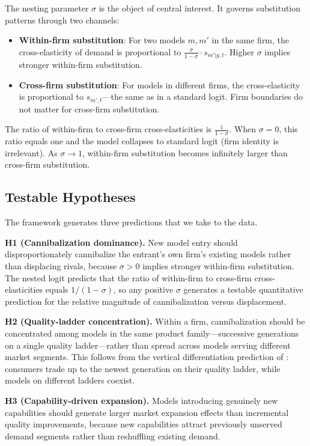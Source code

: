 \documentclass[11pt, a4paper]{article}
\begin{document}
The nesting parameter $\sigma$ is the object of central interest. It governs substitution patterns through two channels:

\begin{itemize}[nosep]
\item \textbf{Within-firm substitution}: For two models $m, m'$ in the same firm, the cross-elasticity of demand is proportional to $\frac{\sigma}{1-\sigma} \cdot s_{m'|g,t}$. Higher $\sigma$ implies stronger within-firm substitution.
\item \textbf{Cross-firm substitution}: For models in different firms, the cross-elasticity is proportional to $s_{m',t}$---the same as in a standard logit. Firm boundaries do not matter for cross-firm substitution.
\end{itemize}

The ratio of within-firm to cross-firm cross-elasticities is $\frac{1}{1-\sigma}$. When $\sigma = 0$, this ratio equals one and the model collapses to standard logit (firm identity is irrelevant). As $\sigma \to 1$, within-firm substitution becomes infinitely larger than cross-firm substitution.

\subsection{Testable Hypotheses}

The framework generates three predictions that we take to the data.

\medskip
\noindent \textbf{H1 (Cannibalization dominance).} New model entry should disproportionately cannibalize the entrant's own firm's existing models rather than displacing rivals, because $\sigma > 0$ implies stronger within-firm substitution. The nested logit predicts that the ratio of within-firm to cross-firm cross-elasticities equals $1/(1-\sigma)$, so any positive $\sigma$ generates a testable quantitative prediction for the relative magnitude of cannibalization versus displacement.

\medskip
\noindent \textbf{H2 (Quality-ladder concentration).} Within a firm, cannibalization should be concentrated among models in the same product family---successive generations on a single quality ladder---rather than spread across models serving different market segments. This follows from the vertical differentiation prediction of \citet{shaked1982relaxing}: consumers trade up to the newest generation on their quality ladder, while models on different ladders coexist.

\medskip
\noindent \textbf{H3 (Capability-driven expansion).} Models introducing genuinely new capabilities should generate larger market expansion effects than incremental quality improvements, because new capabilities attract previously unserved demand segments rather than reshuffling existing demand.
\end{document}
